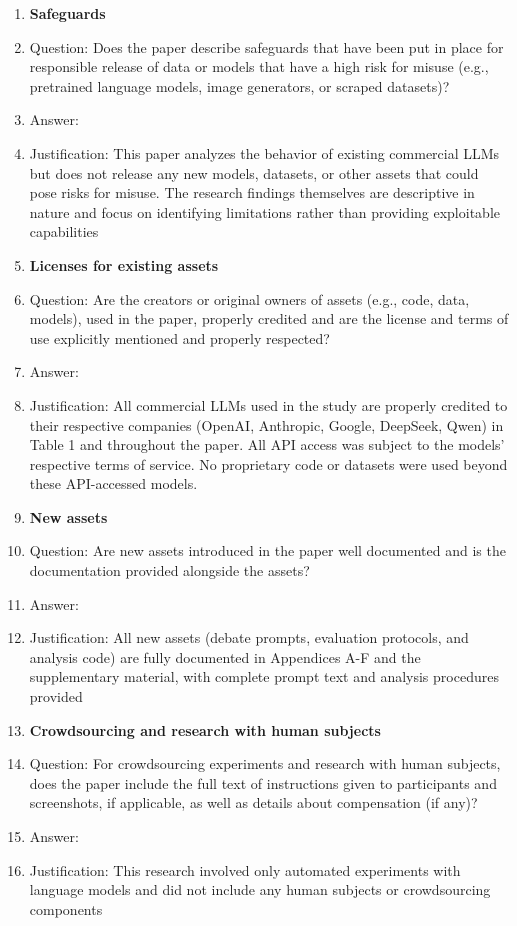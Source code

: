\documentclass{article}
\begin{document}
\begin{enumerate}
\item {\bf Safeguards}
    \item[] Question: Does the paper describe safeguards that have been put in place for responsible release of data or models that have a high risk for misuse (e.g., pretrained language models, image generators, or scraped datasets)?
    \item[] Answer: \answerNA{} %
    \item[] Justification: This paper analyzes the behavior of existing commercial LLMs but does not release any new models, datasets, or other assets that could pose risks for misuse. The research findings themselves are descriptive in nature and focus on identifying limitations rather than providing exploitable capabilities

\item {\bf Licenses for existing assets}
    \item[] Question: Are the creators or original owners of assets (e.g., code, data, models), used in the paper, properly credited and are the license and terms of use explicitly mentioned and properly respected?
    \item[] Answer: \answerYes{} %
    \item[] Justification: All commercial LLMs used in the study are properly credited to their respective companies (OpenAI, Anthropic, Google, DeepSeek, Qwen) in Table 1 and throughout the paper. All API access was subject to the models' respective terms of service. No proprietary code or datasets were used beyond these API-accessed models.


\item {\bf New assets}
    \item[] Question: Are new assets introduced in the paper well documented and is the documentation provided alongside the assets?
    \item[] Answer: \answerYes{} %
    \item[] Justification: All new assets (debate prompts, evaluation protocols, and analysis code) are fully documented in Appendices A-F and the supplementary material, with complete prompt text and analysis procedures provided

\item {\bf Crowdsourcing and research with human subjects}
    \item[] Question: For crowdsourcing experiments and research with human subjects, does the paper include the full text of instructions given to participants and screenshots, if applicable, as well as details about compensation (if any)?
    \item[] Answer: \answerNA{} %
    \item[] Justification: This research involved only automated experiments with language models and did not include any human subjects or crowdsourcing components


\end{enumerate}
\end{document}
